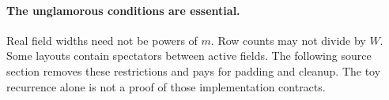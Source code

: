 \paragraph{The unglamorous conditions are essential.}
Real field widths need not be powers of $m$. Row counts may not divide by
$W$. Some layouts contain spectators between active fields. The following
source section removes these restrictions and pays for padding and cleanup.
The toy recurrence alone is not a proof of those implementation contracts.

